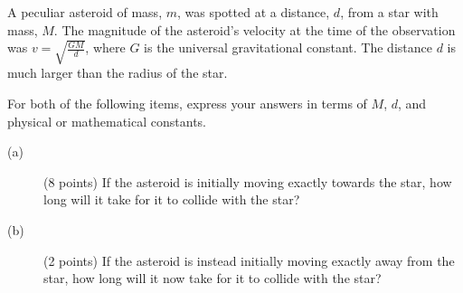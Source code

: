 A peculiar asteroid of mass, $m$, was spotted at a distance, $d$, from a star
with mass, $M$. The magnitude of the asteroid's velocity at the time of the
observation was $v = \sqrt{\frac{GM}{d}}$, where $G$ is the universal
gravitational constant. The distance $d$ is much larger than the radius of the
star.

For both of the following items, express your answers in terms of $M$, $d$,
and physical or mathematical constants.

\begin{description}
\item[(a)] (8 points) If the asteroid is initially moving exactly towards the
  star, how long will it take for it to collide with the star?
\item[(b)] (2 points) If the asteroid is instead initially moving exactly away
  from the star, how long will it now take for it to collide with the star?
\end{description}
